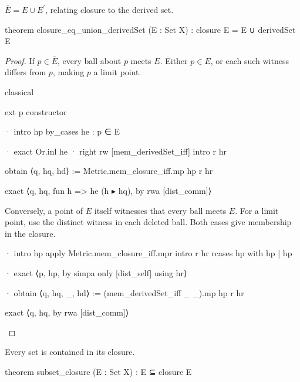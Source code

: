 \begin{lemma}
  \label{an1:lem:closure-eq-union-limitPoints}
  $\overline E=E\cup E^{\prime}$, relating closure to the derived set.

  \begin{lean}
    theorem closure_eq_union_derivedSet (E : Set X) :
        closure E = E ∪ derivedSet E
  \end{lean}
\end{lemma}

\begin{proof}
  If $p\in\overline E$, every ball about $p$ meets $E$.
  Either $p\in E$, or each such witness differs from $p$, making $p$ a limit point.

  \begin{lean}
    classical

    ext p
    constructor

    · intro hp
      by_cases he : p ∈ E

      · exact Or.inl he
      · right
        rw [mem_derivedSet_iff]
        intro r hr

        obtain ⟨q, hq, hd⟩ := Metric.mem_closure_iff.mp hp r hr

        exact ⟨q, hq, fun h => he (h ▸ hq), by rwa [dist_comm]⟩
  \end{lean}

  Conversely, a point of $E$ itself witnesses that every ball meets $E$.
  For a limit point, use the distinct witness in each deleted ball.
  Both cases give membership in the closure.

  \begin{lean}
    · intro hp
      apply Metric.mem_closure_iff.mpr
      intro r hr
      rcases hp with hp | hp

      · exact ⟨p, hp, by simpa only [dist_self] using hr⟩

      · obtain ⟨q, hq, _, hd⟩ := (mem_derivedSet_iff _ _).mp hp r hr

        exact ⟨q, hq, by rwa [dist_comm]⟩
  \end{lean}

\end{proof}

\begin{lemma}
  \label{an1:lem:subset-closure}
  Every set is contained in its closure.

  \begin{lean}
    theorem subset_closure (E : Set X) : E ⊆ closure E
  \end{lean}
\end{lemma}

